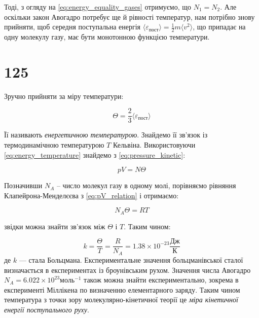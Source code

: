 Тоді, з огляду на \eqref{eq:energy_equality_gases} отримуємо, що $N_1 = N_2$. Але оскільки закон
Авогадро потребує ще й рівності температур, нам потрібно знову прийняти, щоб середня поступальна
енергія $\langle \varepsilon_{\text{пост}} \rangle = \frac{1}{2}m\langle v^2 \rangle$, що припадає на
одну молекулу газу, має бути монотонною функцією температури.

\section{125}

Зручно прийняти за міру температури:

\begin{equation}\label{eq:energy_temperature}
\Theta = \frac{2}{3}\langle \varepsilon_{\text{пост}} \rangle
\end{equation}

Її називають \emph{енергетичною температурою}. Знайдемо її зв'язок із термодинамічною температурою $T$
Кельвіна. Використовуючи \eqref{eq:energy_temperature} знайдемо з \eqref{eq:pressure_kinetic}:

\begin{equation}\label{eq:pV_relation}
pV = N\Theta
\end{equation}

Позначивши $N_A$ -- число молекул газу в одному молі, порівняємо рівняння Клапейрона-Менделєєва з
\eqref{eq:pV_relation} і отримаємо:

\begin{equation}\label{eq:NA_relation}
N_A\Theta = RT
\end{equation}

звідки можна знайти зв'язок між $\Theta$ і $T$. Таким чином:

\begin{equation}\label{eq:boltzmann_constant}
k = \frac{\Theta}{T} = \frac{R}{N_A} = 1.38 \times 10^{-23} \frac{\text{Дж}}{\text{К}}
\end{equation}
де $k$ --- стала Больцмана. Експериментальне значення больцманівської сталої визначається в
експериментах із броунівським рухом. Значення числа Авогадро $N_A = 6.022 \times 10^{23} \text{
моль}^{-1}$ також можна знайти експериментально, зокрема в експерименті Міллікена по визначенню
елементарного заряду. Таким чином температура з точки зору молекулярно-кінетичної теорії це \emph{міра
кінетичної енергії поступального руху}.

